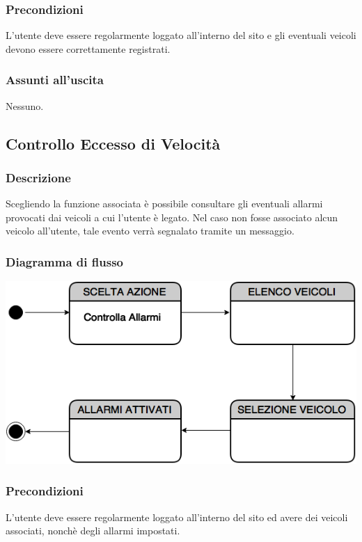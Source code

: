 \documentclass[a4paper,12pt]{article}
\begin{document}
\subsubsection{Precondizioni}
L'utente deve essere regolarmente loggato all'interno del sito e gli eventuali veicoli devono essere correttamente registrati.
\subsubsection{Assunti all'uscita}
Nessuno.


\subsection{Controllo Eccesso di Velocità}
\subsubsection{Descrizione}
Scegliendo la funzione associata è possibile consultare gli eventuali allarmi provocati dai veicoli a cui l'utente è legato. Nel caso non fosse associato alcun veicolo all'utente, tale evento verrà segnalato tramite un messaggio. 

\subsubsection{Diagramma di flusso}

\begin{center}
\includegraphics[scale=0.65]{Allarmi.png}
\end{center}
\subsubsection{Precondizioni}
L'utente deve essere regolarmente loggato all'interno del sito ed avere dei veicoli associati, nonchè degli allarmi impostati.
\end{document}
